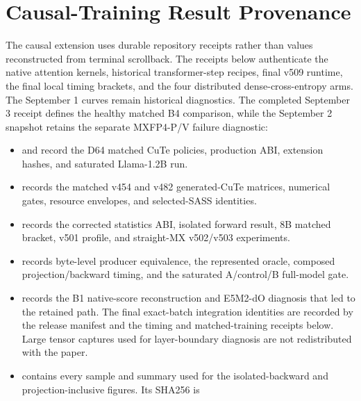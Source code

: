 \section{Causal-Training Result Provenance}
\label{app:causal-training-provenance}

The causal extension uses durable repository receipts rather than values
reconstructed from terminal scrollback.  The receipts below authenticate the
native attention kernels, historical transformer-step recipes, final v509
runtime, the final local timing brackets, and the four distributed
dense-cross-entropy arms.  The September 1 curves remain historical
diagnostics.  The completed September 3 receipt defines the healthy matched
B4 comparison, while the September 2 snapshot retains the separate MXFP4-P/V
failure diagnostic:

\begin{itemize}
  \item {}
  and  record the D64
  matched CuTe policies, production ABI, extension hashes, and saturated
  Llama-1.2B run.
  \item {} records the
  matched v454 and v482 generated-CuTe matrices, numerical gates, resource
  envelopes, and selected-SASS identities.
  \item {}
  records the corrected statistics ABI, isolated forward result, 8B matched
  bracket, v501 profile, and straight-MX v502/v503 experiments.
  \item {}
  records byte-level producer equivalence, the represented oracle, composed
  projection/backward timing, and the saturated A/control/B full-model gate.
  \item {}
  records the B1 native-score reconstruction and E5M2-dO diagnosis that led to
  the retained path. The final exact-batch integration identities are recorded
  by the release manifest and the timing and matched-training receipts below.
  Large tensor captures used for layer-boundary diagnosis are not
  redistributed with the paper.
  \item {}
  contains every sample and summary used for the isolated-backward and
  projection-inclusive figures.  Its SHA256 is

\end{itemize}

